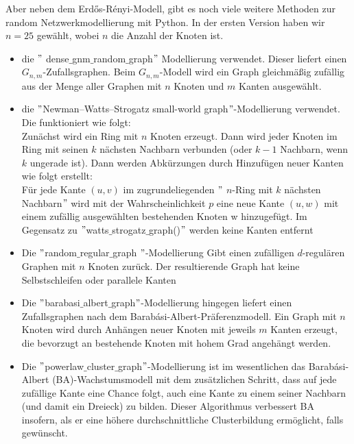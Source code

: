 Aber neben dem Erdős-Rényi-Modell, gibt es noch viele weitere Methoden zur random Netzwerkmodellierung mit Python. In der ersten Version haben wir $n = 25$ gewählt, wobei $n$ die Anzahl der Knoten ist.
\begin{itemize}
    \item die $"$ dense$\_$gnm$\_$random$\_$graph$"$ Modellierung verwendet. Dieser liefert einen $G_{n,m}$-Zufallsgraphen.
    Beim $G_{n,m}$-Modell wird ein Graph gleichmäßig zufällig aus der Menge aller Graphen mit $n$ Knoten und $m$ Kanten ausgewählt.
    \item die $"$Newman–Watts–Strogatz small-world graph$"$-Modellierung verwendet. Die funktioniert wie folgt: \\
    Zunächst wird ein Ring mit $n$ Knoten erzeugt. Dann wird jeder Knoten im Ring mit seinen $k$ nächsten Nachbarn verbunden (oder $k - 1$ Nachbarn, wenn $k$ ungerade ist). Dann werden Abkürzungen durch Hinzufügen neuer Kanten wie folgt erstellt: \\
    Für jede Kante $(u, v)$ im zugrundeliegenden $"$ $n$-Ring mit $k$ nächsten Nachbarn$"$ wird mit der Wahrscheinlichkeit $p$ eine neue Kante $(u, w)$ mit einem zufällig ausgewählten bestehenden Knoten w hinzugefügt. Im Gegensatz zu $"$watts$\_$strogatz$\_$graph()$"$ werden keine Kanten entfernt
    \item Die $"$random$\_$regular$\_$graph $"$-Modellierung Gibt einen zufälligen $d$-regulären Graphen mit $n$ Knoten zurück.
    Der resultierende Graph hat keine Selbstschleifen oder parallele Kanten
    \item Die $"$barabasi$\_$albert$\_$graph$"$-Modellierung hingegen liefert einen Zufallsgraphen nach dem Barabási-Albert-Präferenzmodell.
    Ein Graph mit $n$ Knoten wird durch Anhängen neuer Knoten mit jeweils $m$ Kanten erzeugt, die bevorzugt an bestehende Knoten mit hohem Grad angehängt werden.
    \item Die $"$powerlaw$\_$cluster$\_$graph$"$-Modellierung ist im wesentlichen das Barabási-Albert (BA)-Wachstumsmodell mit dem zusätzlichen Schritt, dass auf jede zufällige Kante eine Chance folgt, auch eine Kante zu einem seiner Nachbarn (und damit ein Dreieck) zu bilden. Dieser Algorithmus verbessert BA insofern, als er eine höhere durchschnittliche Clusterbildung ermöglicht, falls gewünscht.
\end{itemize}

